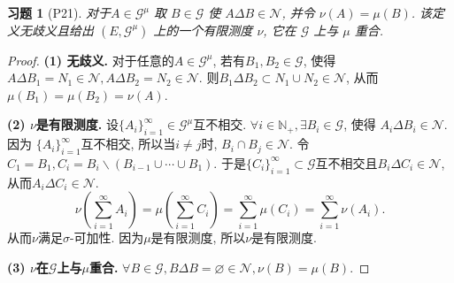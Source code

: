 \documentclass[UTF8,ondside]{ctexart}
\newtheorem{exercise}{习题}[section]
\newcommand{\h}{\mathscr}
\newcommand{\kx}{\mathbb}
\numberwithin{equation}{section}
\begin{document}
	\begin{exercise}[P21]
		对于$A\in \h G^\mu$ 取 $B\in \h G$ 使 $A\Delta B\in \h N$, 并令 $\nu(A)=\mu(B)$. 该定义无歧义且给出 $(E,\h G^\mu)$ 上的一个有限测度 $\nu$, 它在 $\h G$ 上与 $\mu$ 重合. 
	\end{exercise}
	\begin{proof}
		\textbf{(1) 无歧义.}
		对于任意的$A\in\h G^\mu$, 若有$B_1,B_2\in\h G$, 使得 $A\Delta B_1=N_1\in\h N, A\Delta B_2=N_2\in \h N$. 则$B_1\Delta B_2\subset N_1\cup N_2\in \h N$, 从而$\mu(B_1)=\mu(B_2)=\nu(A)$.

		\textbf{(2) $\nu$是有限测度.} 设$\{A_i\}_{i=1}^\infty\in \h G^\mu$互不相交. $\forall i\in \kx N_+, \exists B_i\in \h G$, 使得 $A_i\Delta B_i\in \h N$. 因为 $\{A_i\}_{i=1}^\infty$互不相交, 所以当$i\neq j$时, $B_i\cap B_j\in \h N$. 令 $C_1=B_1,C_i=B_i\backslash(B_{i-1}\cup\cdots\cup B_1)$. 于是$\{C_i\}_{i=1}^\infty\subset\h G$互不相交且$B_i\Delta C_i\in\h N$, 从而$A_i\Delta C_i\in\h N$. 
		\[
			\nu\left(\sum_{i=1}^\infty A_i\right)=\mu\left(\sum_{i=1}^\infty C_i\right)=\sum_{i=1}^\infty\mu(C_i)=\sum_{i=1}^\infty\nu(A_i).
		\]
		从而$\nu$满足$\sigma$-可加性. 因为$\mu$是有限测度, 所以$\nu$是有限测度.

		\textbf{(3) $\nu$在$\h G$上与$\mu$重合.} $\forall B\in \h G, B\Delta B=\varnothing\in\h N,\nu(B)=\mu(B)$.
	\end{proof}
	\newpage
\end{document}
